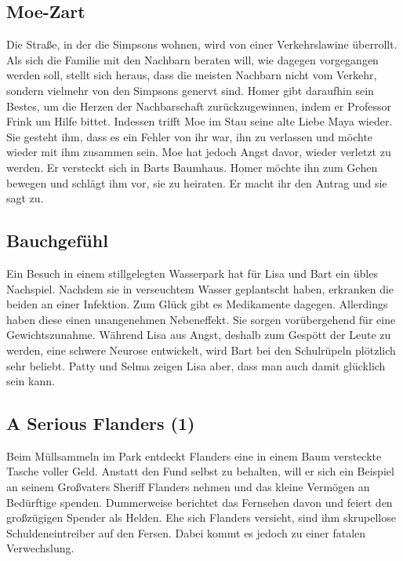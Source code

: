 \subsection{Moe-Zart}
Die Straße, in der die Simpsons wohnen, wird von einer Verkehrslawine überrollt. Als sich die Familie mit den Nachbarn beraten will, wie dagegen vorgegangen werden soll, stellt sich heraus, dass die meisten Nachbarn nicht vom Verkehr, sondern vielmehr von den Simpsons genervt sind. Homer gibt daraufhin sein Bestes, um die Herzen der Nachbarschaft zurückzugewinnen, indem er Professor Frink um Hilfe bittet. Indessen trifft Moe im Stau seine alte Liebe Maya wieder. Sie gesteht ihm, dass es ein Fehler von ihr war, ihn zu verlassen und möchte wieder mit ihm zusammen sein. Moe hat jedoch Angst davor, wieder verletzt zu werden. Er versteckt sich in Barts Baumhaus. Homer möchte ihn zum Gehen bewegen und schlägt ihm vor, sie zu heiraten. Er macht ihr den Antrag und sie sagt zu.


\subsection{Bauchgefühl}
Ein Besuch in einem stillgelegten Wasserpark hat für Lisa und Bart ein übles Nachspiel. Nachdem sie in verseuchtem Wasser geplantscht haben, erkranken die beiden an einer Infektion. Zum Glück gibt es Medikamente dagegen. Allerdings haben diese einen unangenehmen Nebeneffekt. Sie sorgen vorübergehend für eine Gewichtszunahme. Während Lisa aus Angst, deshalb zum Gespött der Leute zu werden, eine schwere Neurose entwickelt, wird Bart bei den Schulrüpeln plötzlich sehr beliebt. Patty und Selma zeigen Lisa aber, dass man auch damit glücklich sein kann.


\subsection{A Serious Flanders (1)}
Beim Müllsammeln im Park entdeckt Flanders eine in einem Baum versteckte Tasche voller Geld. Anstatt den Fund selbst zu behalten, will er sich ein Beispiel an seinem Großvaters Sheriff Flanders nehmen und das kleine Vermögen an Bedürftige spenden. Dummerweise berichtet das Fernsehen davon und feiert den großzügigen Spender als Helden. Ehe sich Flanders versieht, sind ihm skrupellose Schuldeneintreiber auf den Fersen. Dabei kommt es jedoch zu einer fatalen Verwechslung.

